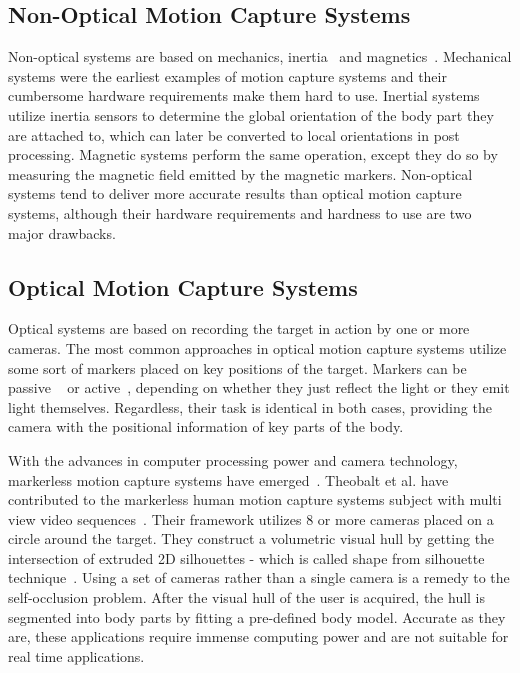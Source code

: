 \subsection{Non-Optical Motion Capture Systems}
 
Non-optical systems are based on mechanics, inertia~\cite{Miller2004} and magnetics~\cite{Yabukami2000}. Mechanical systems were the earliest examples of motion capture systems and their cumbersome hardware requirements make them hard to use. Inertial systems utilize inertia sensors to determine the global orientation of the body part they are attached to, which can later be converted to local orientations in post processing. Magnetic systems perform the same operation, except they do so by measuring the magnetic field emitted by the magnetic markers. Non-optical systems tend to deliver more accurate results than optical motion capture systems, although their hardware requirements and hardness to use are two major drawbacks. 
 
\subsection{Optical Motion Capture Systems}

Optical systems are based on recording the target in action by one or more cameras. The most common approaches in optical motion capture systems utilize some sort of markers placed on key positions of the target. Markers can be passive ~\cite{Sementille2004} or active~\cite{Maletsky2007}, depending on whether they just reflect the light or they emit light themselves. Regardless, their task is identical in both cases, providing the camera with the positional information of key parts of the body. 
 
With the advances in computer processing power and camera technology, markerless motion capture systems have emerged~\cite{Cheung2003}. Theobalt et al. have contributed to the markerless human motion capture systems subject with multi view video sequences~\cite{Aguiar2007,Gall2009,Liu2011}. Their framework utilizes 8 or more cameras placed on a circle around the target. They construct a volumetric visual hull by getting the intersection of extruded 2D silhouettes - which is called shape from silhouette technique~\cite{Cheung2000,Cheung2005}. Using a set of cameras rather than a single camera is a remedy to the self-occlusion problem. After the visual hull of the user is acquired, the hull is segmented into body parts by fitting a pre-defined body model. Accurate as they are, these
applications require immense computing power and are not suitable for real time applications. 
 
